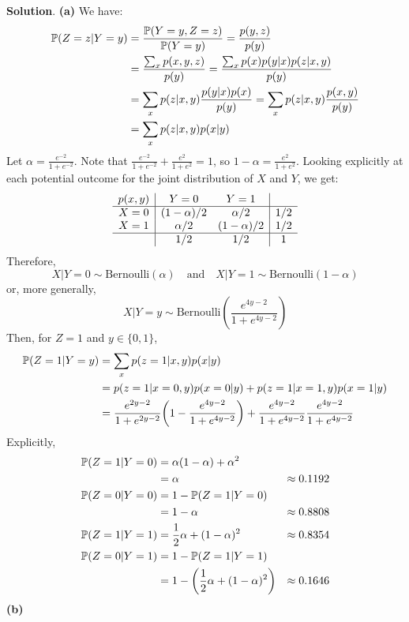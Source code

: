 \textbf{Solution}.
\textbf{(a)}
We have:
\begin{align*}
\operatorname{\mathbb{P}}(Z = z | Y = y) &= \frac{\operatorname{\mathbb{P}}(Y = y, Z = z)}{\operatorname{\mathbb{P}}(Y = y)} = \frac{p(y, z)}{p(y)} \\
&= \frac{\sum_x p(x, y, z)}{p(y)} = \frac{\sum_x p(x) p(y | x) p(z | x, y)}{p(y)} \\
&= \sum_x p(z | x, y) \frac{p(y | x) p(x)}{p(y)} = \sum_x p(z | x, y) \frac{p(x, y)}{p(y)} \\
&= \sum_x p(z | x, y) p(x | y)
\end{align*}
Let \(\alpha = \frac{e^{-2}}{1 + e^{-2}}\). Note that
\(\frac{e^{-2}}{1 + e^{-2}} + \frac{e^{2}}{1 + e^{2}} = 1\), so
\(1 - \alpha = \frac{e^{2}}{1 + e^{2}}\).
Looking explicitly at each potential outcome for the joint distribution
of \(X\) and \(Y\), we get:
\[
\begin{array}{c | cc | c}
p(x, y) & Y = 0 & Y = 1 & \\
\hline
X = 0 & (1 - \alpha) / 2 & \alpha / 2 & 1/2 \\
X = 1 & \alpha / 2 & (1 - \alpha) / 2 & 1/2 \\
\hline
  & 1/2 & 1/2 & 1
\end{array}
\]
Therefore,
\[
X | Y = 0 \sim \text{Bernoulli}\left( \alpha \right) 
\quad \text{and} \quad
X | Y = 1 \sim \text{Bernoulli}\left( 1 - \alpha \right) 
\]
or, more generally,
\[
X | Y = y \sim \text{Bernoulli}\left( \frac{e^{4y - 2}}{1 + e^{4y - 2}} \right) 
\]
Then, for \(Z = 1\) and \(y \in \{ 0, 1 \}\),
\begin{align*}
\PROB(Z = 1 | Y = y) &= \sum_x p(z = 1 | x, y) p(x | y) \\
&= p(z = 1 | x = 0, y) p(x = 0 | y) + p(z = 1 | x = 1, y) p(x = 1 | y) \\
&= \frac{e^{2y - 2}}{1 + e^{2y - 2}} \left( 1 - \frac{e^{4y - 2}}{1 + e^{4y - 2}} \right) + \frac{e^{4y - 2}}{1 + e^{4y - 2}} \frac{e^{4y - 2}}{1 + e^{4y - 2}}
\end{align*}
Explicitly,
\begin{align*}
\PROB(Z = 1 | Y = 0) &= \alpha (1 - \alpha) + \alpha^{2} \\
&= \alpha  &\approx 0.1192 \\
\PROB(Z = 0 | Y = 0) &= 1 - \PROB(Z = 1 | Y = 0) \\
&= 1 - \alpha &\approx 0.8808\\
\PROB(Z = 1 | Y = 1) &= \frac{1}{2} \alpha + (1 - \alpha)^{2} &\approx 0.8354\\
\PROB(Z = 0 | Y = 1) &= 1 - \PROB(Z = 1 | Y = 1) \\
&= 1 - \left(\frac{1}{2} \alpha + (1 - \alpha)^{2} \right) &\approx 0.1646\\
\end{align*}
\textbf{(b)}

